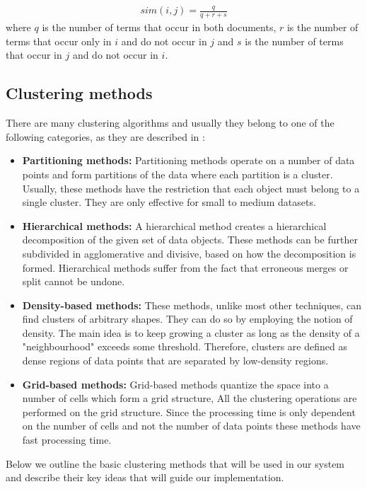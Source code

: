 \begin{eqnarray}
sim(i,j) = \frac{q}{q + r + s}  
\end{eqnarray} 
where $q$ is the number of terms that occur in both documents, $r$ is the number of terms that occur only in $i$ and do not occur in $j$ and $s$ is the  number of terms that occur in $j$ and do not occur in $i$.


\subsection{Clustering methods}
There are many clustering algorithms and usually they belong to one of the following categories, as they are described in \citep{han2005}:

\begin{itemize}
 \item \textbf{Partitioning methods:} Partitioning methods operate on a number of data points and form partitions of the data where each partition is a cluster. Usually, these methods have the restriction that each object must belong to a single cluster. They are only effective for small to medium datasets. 
 \item \textbf{Hierarchical methods:} A hierarchical method creates a hierarchical decomposition of the given set of data objects. These methods can be further subdivided 
 in agglomerative and divisive, based on how the decomposition is formed. Hierarchical methods suffer from the fact that erroneous merges or split cannot be undone. 
 \item \textbf{Density-based methods:} These methods, unlike most other techniques, can find clusters of arbitrary shapes. They can do so by employing the notion of density. The
 main idea is to keep growing a cluster as long as the density of a "neighbourhood" exceeds some threshold. Therefore, clusters are defined as dense regions of data points that are separated 
 by low-density regions.
 \item \textbf{Grid-based methods:} Grid-based methods quantize the space into a number of cells which form a grid structure, All the clustering operations are performed on the grid structure. Since the processing time is only dependent on the number of cells and not the number of data points these methods have fast processing time. 
\end{itemize}\vspace{15pt}
Below we outline the basic clustering methods that will be used in our system and describe their key ideas that will guide our implementation. 

